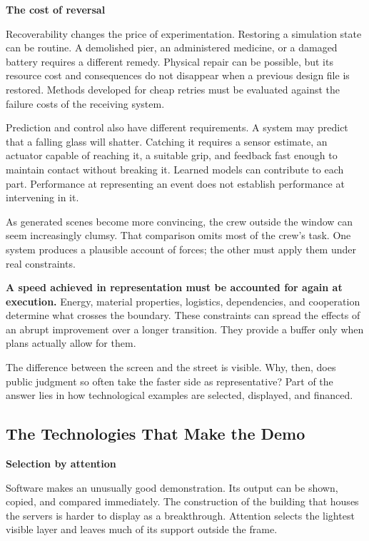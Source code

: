 \documentclass[11pt,openany]{book}
\newcommand{\key}[1]{\textbf{#1}}
\newcommand{\subhead}[1]{\par\medskip\noindent\textbf{#1}\par\nobreak\smallskip}
\begin{document}
\subhead{The cost of reversal}

Recoverability changes the price of experimentation. Restoring a simulation state can be routine. A demolished pier, an administered medicine, or a damaged battery requires a different remedy. Physical repair can be possible, but its resource cost and consequences do not disappear when a previous design file is restored. Methods developed for cheap retries must be evaluated against the failure costs of the receiving system.

Prediction and control also have different requirements. A system may predict that a falling glass will shatter. Catching it requires a sensor estimate, an actuator capable of reaching it, a suitable grip, and feedback fast enough to maintain contact without breaking it. Learned models can contribute to each part. Performance at representing an event does not establish performance at intervening in it.

As generated scenes become more convincing, the crew outside the window can seem increasingly clumsy. That comparison omits most of the crew's task. One system produces a plausible account of forces; the other must apply them under real constraints.

\key{A speed achieved in representation must be accounted for again at execution.} Energy, material properties, logistics, dependencies, and cooperation determine what crosses the boundary. These constraints can spread the effects of an abrupt improvement over a longer transition. They provide a buffer only when plans actually allow for them.

The difference between the screen and the street is visible. Why, then, does public judgment so often take the faster side as representative? Part of the answer lies in how technological examples are selected, displayed, and financed.

\subsection{The Technologies That Make the Demo}

\subhead{Selection by attention}

Software makes an unusually good demonstration. Its output can be shown, copied, and compared immediately. The construction of the building that houses the servers is harder to display as a breakthrough. Attention selects the lightest visible layer and leaves much of its support outside the frame.
\end{document}
